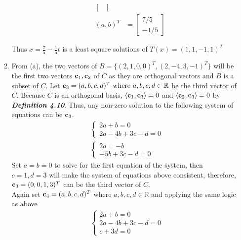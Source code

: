 \documentclass{uofa-eng-assignment}
\begin{document}
\begin{enumerate}
\begin{enumerate}
\begin{enumerate}
\begin{align*}
\begin{bmatrix}
	      		      	\end{bmatrix} \\
	      		      	(a, b)^T &= \begin{bmatrix}
	      		      	7/5 \\ -1/5
	      		      	\end{bmatrix}
	      		      \end{align*}
	      	\end{enumerate}
	      	Thus $x = \frac{7}{5} - \frac{1}{5}t$ is a least square solutions of $T(x) = (1, 1, -1, 1)^T$
	      	\item From (a), the two vectors of $B = \{(2, 1, 0, 0)^T, (2, -4, 3, -1)^T\}$ will be the first two vectors $\vb{c}_1, \vb{c}_2$ of $C$ as  they are orthogonal vectors and $B$ is a subset of $C$. Let $\vb{c}_3 = (a, b, c, d)^T \text{ where } a, b, c, d\in \mathbb{R}$ be the third vector of $C$. Because $C$ is an orthogonal basis, $\langle \vb{c}_1, \vb{c}_3 \rangle = 0$ and $\langle \vb{c}_2, \vb{c}_3 \rangle = 0$ by \textit{\textbf{Definition 4.10}}. Thus,      any non-zero solution to the following system of equations can be $\vb{c}_3$.
	      	      \begin{align*}
	      	      	  & \begin{cases} 
	      	      	2a + b = 0 \\
	      	      	2a -4b + 3c - d = 0
	      	      	\end{cases} \\
	      	      	  & \begin{cases} 
	      	      	2a = -b \\
	      	      	-5b + 3c - d = 0
	      	      	\end{cases}
	      	      \end{align*}
	      	      Set $a = b = 0$ to solve for the first equation of the system, then $c = 1, d = 3$ will make the system of equations above consistent, therefore, $\vb{c}_3 = (0, 0, 1, 3)^T$ can be the third vector of $C$. \\
	      	      Again set $\vb{c}_4 = (a, b, c, d)^T$ where $a, b, c, d \in \mathbb{R}$ and applying the same logic as above
	      	      \begin{align*}
	      	      	  & \begin{cases} 
	      	      	2a + b = 0 \\
	      	      	2a -4b + 3c - d = 0 \\
	      	      	c + 3d = 0
	      	      	\end{cases} \\            

\end{align*}
\end{enumerate}
\end{enumerate}
\end{document}

